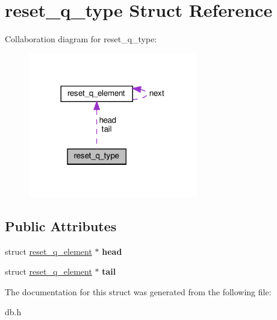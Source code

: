 \hypertarget{structreset__q__type}{}\section{reset\+\_\+q\+\_\+type Struct Reference}
\label{structreset__q__type}


Collaboration diagram for reset\+\_\+q\+\_\+type\+:\nopagebreak
\begin{figure}[H]
\begin{center}
\leavevmode
\includegraphics[width=209pt]{structreset__q__type__coll__graph}
\end{center}
\end{figure}
\subsection*{Public Attributes}
\begin{DoxyCompactItemize}
\item 
\mbox{\label{structreset__q__type_a707beadd5f954e4892e43783a7ea5ab7}} 
struct \hyperlink{structreset__q__element}{reset\+\_\+q\+\_\+element} $\ast$ {\bfseries head}
\item 
\mbox{\label{structreset__q__type_aaaf7b8cc04aec7fd039d60a73da6705e}} 
struct \hyperlink{structreset__q__element}{reset\+\_\+q\+\_\+element} $\ast$ {\bfseries tail}
\end{DoxyCompactItemize}


The documentation for this struct was generated from the following file\+:\begin{DoxyCompactItemize}
\item 
db.\+h\end{DoxyCompactItemize}
